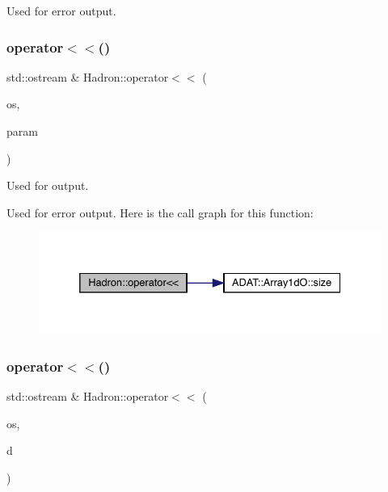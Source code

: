 Used for error output. 

\mbox{\label{namespaceHadron_a815bc759a8acf71f5194f582a963f3f7}} 
\subsubsection{\texorpdfstring{operator$<$$<$()}{operator<<()}\hspace{0.1cm}{\footnotesize\ttfamily [23/48]}}
{\footnotesize\ttfamily std\+::ostream \& Hadron\+::operator$<$$<$ (\begin{DoxyParamCaption}\item[{std\+::ostream \&}]{os,  }\item[{const \mbox{\hyperlink{classADAT_1_1Array1dO}{Array1dO}}$<$ \mbox{\hyperlink{structHadron_1_1KeyParticleOp__t}{Key\+Particle\+Op\+\_\+t}} $>$ \&}]{param }\end{DoxyParamCaption})}



Used for output. 

Used for error output. Here is the call graph for this function\+:
\nopagebreak
\begin{figure}[H]
\begin{center}
\leavevmode
\includegraphics[width=332pt]{d1/daf/namespaceHadron_a815bc759a8acf71f5194f582a963f3f7_cgraph}
\end{center}
\end{figure}
\mbox{\label{namespaceHadron_a6bcf2658e0321428eeedf53a15a894aa}} 
\subsubsection{\texorpdfstring{operator$<$$<$()}{operator<<()}\hspace{0.1cm}{\footnotesize\ttfamily [24/48]}}
{\footnotesize\ttfamily std\+::ostream \& Hadron\+::operator$<$$<$ (\begin{DoxyParamCaption}\item[{std\+::ostream \&}]{os,  }\item[{const \mbox{\hyperlink{structHadron_1_1KeyGenPropElementalOperator__t}{Key\+Gen\+Prop\+Elemental\+Operator\+\_\+t}} \&}]{d }\end{DoxyParamCaption})}



